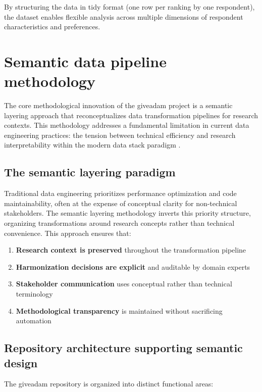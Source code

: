 \documentclass{article}
\begin{document}
By structuring the data in tidy format (one row per ranking by one respondent), the dataset enables flexible analysis across multiple dimensions of respondent characteristics and preferences. 

\section{Semantic data pipeline methodology}
\label{sec:semantic-methodology}

The core methodological innovation of the giveadam project is a semantic layering approach that reconceptualizes data transformation pipelines for research contexts. This methodology addresses a fundamental limitation in current data engineering practices: the tension between technical efficiency and research interpretability within the modern data stack paradigm \cite{modern_data_stack_airbyte}.

\subsection{The semantic layering paradigm}
\label{subsec:semantic-paradigm}

Traditional data engineering prioritizes performance optimization and code maintainability, often at the expense of conceptual clarity for non-technical stakeholders. The semantic layering methodology inverts this priority structure, organizing transformations around research concepts rather than technical convenience. This approach ensures that:

\begin{enumerate}
    \item \textbf{Research context is preserved} throughout the transformation pipeline
    \item \textbf{Harmonization decisions are explicit} and auditable by domain experts  
    \item \textbf{Stakeholder communication} uses conceptual rather than technical terminology
    \item \textbf{Methodological transparency} is maintained without sacrificing automation
\end{enumerate}

\subsection{Repository architecture supporting semantic design}
\label{sec:repository-arch}

The giveadam repository is organized into distinct functional areas:
\end{document}

